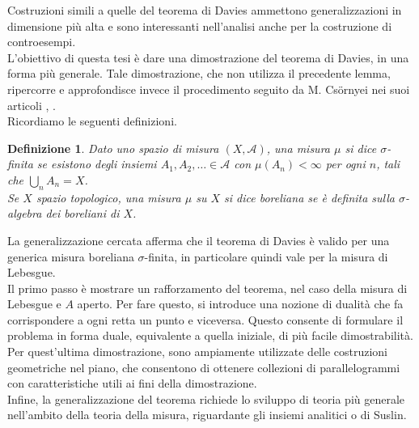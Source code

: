 \documentclass[a4paper, twoside,openright]{article}
\newcommand{\<}{\langle}
\renewcommand{\>}{\rangle}
\newtheorem{defin}[teo]{Definizione}
\begin{document}
	Costruzioni simili a quelle del teorema di Davies ammettono generalizzazioni in dimensione più alta e sono interessanti nell’analisi anche per la costruzione di controesempi.\\
	L’obiettivo di questa tesi è dare una dimostrazione del teorema di Davies, in una forma più generale. Tale dimostrazione, che non utilizza il precedente lemma, ripercorre e approfondisce invece il procedimento seguito da M. Cs\"{o}rnyei nei suoi articoli \Cite{1}, \cite{2}.\\
	
	Ricordiamo le seguenti definizioni.
	\begin{defin}
	Dato uno spazio di misura $(X, \mathcal{A})$, una misura $\mu$ si dice $\sigma$-finita se esistono degli insiemi $A_{1},A_{2},\ldots \in {\mathcal {A}}$ con $\mu \left(A_{n}\right)<\infty $ per ogni $n$, tali che $\bigcup _{n}A_{n}=X$.\\
	Se $X$ spazio topologico, una misura $\mu$ su $X$ si dice boreliana se è definita sulla $\sigma$-algebra dei boreliani di $X$. \\
	\end{defin}
	La generalizzazione cercata afferma che il teorema di Davies è valido per una generica misura boreliana $\sigma$-finita, in particolare quindi vale per la misura di Lebesgue.\\
	
	Il primo passo è mostrare un rafforzamento del teorema, nel caso della misura di Lebesgue e $A$ aperto. Per fare questo, si introduce una nozione di dualità che fa corrispondere a ogni retta un punto e viceversa. Questo consente di formulare il problema in forma duale, equivalente a quella iniziale, di più facile dimostrabilità.\\
	Per quest’ultima dimostrazione, sono ampiamente utilizzate delle costruzioni geometriche nel piano, che consentono di ottenere collezioni di parallelogrammi con caratteristiche utili ai fini della dimostrazione.\\
	Infine, la generalizzazione del teorema richiede lo sviluppo di teoria più generale nell’ambito della teoria della misura, riguardante gli insiemi analitici o di Suslin.\\
	
\end{document}
